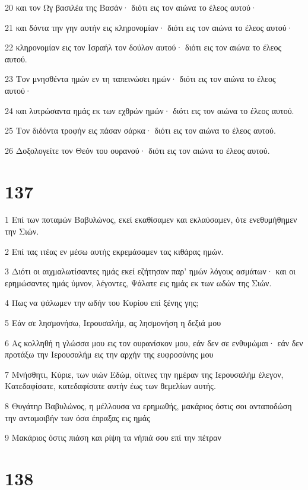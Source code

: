\par 20 και τον Ωγ βασιλέα της Βασάν· διότι εις τον αιώνα το έλεος αυτού·
\par 21 και δόντα την γην αυτήν εις κληρονομίαν· διότι εις τον αιώνα το έλεος αυτού·
\par 22 κληρονομίαν εις τον Ισραήλ τον δούλον αυτού· διότι εις τον αιώνα το έλεος αυτού.
\par 23 Τον μνησθέντα ημών εν τη ταπεινώσει ημών· διότι εις τον αιώνα το έλεος αυτού·
\par 24 και λυτρώσαντα ημάς εκ των εχθρών ημών· διότι εις τον αιώνα το έλεος αυτού.
\par 25 Τον διδόντα τροφήν εις πάσαν σάρκα· διότι εις τον αιώνα το έλεος αυτού.
\par 26 Δοξολογείτε τον Θεόν του ουρανού· διότι εις τον αιώνα το έλεος αυτού.

\chapter{137}

\par 1 Επί των ποταμών Βαβυλώνος, εκεί εκαθίσαμεν και εκλαύσαμεν, ότε ενεθυμήθημεν την Σιών.
\par 2 Επί τας ιτέας εν μέσω αυτής εκρεμάσαμεν τας κιθάρας ημών.
\par 3 Διότι οι αιχμαλωτίσαντες ημάς εκεί εζήτησαν παρ' ημών λόγους ασμάτων· και οι ερημώσαντες ημάς ύμνον, λέγοντες, Ψάλατε εις ημάς εκ των ωδών της Σιών.
\par 4 Πως να ψάλωμεν την ωδήν του Κυρίου επί ξένης γης;
\par 5 Εάν σε λησμονήσω, Ιερουσαλήμ, ας λησμονήση η δεξιά μου
\par 6 Ας κολληθή η γλώσσα μου εις τον ουρανίσκον μου, εάν δεν σε ενθυμώμαι· εάν δεν προτάξω την Ιερουσαλήμ εις την αρχήν της ευφροσύνης μου
\par 7 Μνήσθητι, Κύριε, των υιών Εδώμ, οίτινες την ημέραν της Ιερουσαλήμ έλεγον, Κατεδαφίσατε, κατεδαφίσατε αυτήν έως των θεμελίων αυτής.
\par 8 Θυγάτηρ Βαβυλώνος, η μέλλουσα να ερημωθής, μακάριος όστις σοι ανταποδώση την ανταμοιβήν των όσα έπραξας εις ημάς
\par 9 Μακάριος όστις πιάση και ρίψη τα νήπιά σου επί την πέτραν

\chapter{138}

